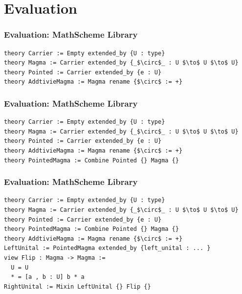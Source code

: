 \documentclass[t,12pt,numbers,fleqn,usenames,xcolor=dvipsnames]{beamer}
\begin{document}
\section{Evaluation}
\begin{frame}[fragile]
\frametitle{Evaluation: MathScheme Library}
\scriptsize	
\begin{lstlisting}
theory Carrier := Empty extended_by {U : type}
theory Magma := Carrier extended_by {_$\circ$_ : U $\to$ U $\to$ U}
theory Pointed := Carrier extended_by {e : U}
theory AddtivieMagma := Magma rename {$\circ$ := +}
\end{lstlisting}
\vfill
{}	
\end{frame}

\begin{frame}[fragile]
\frametitle{Evaluation: MathScheme Library}
\scriptsize	
\begin{lstlisting}
theory Carrier := Empty extended_by {U : type}
theory Magma := Carrier extended_by {_$\circ$_ : U $\to$ U $\to$ U}
theory Pointed := Carrier extended_by {e : U}
theory AddtivieMagma := Magma rename {$\circ$ := +}
theory PointedMagma := Combine Pointed {} Magma {}
\end{lstlisting}
\vfill
{}	
\end{frame}

\begin{frame}[fragile]
\frametitle{Evaluation: MathScheme Library}
\scriptsize	
\begin{lstlisting}
theory Carrier := Empty extended_by {U : type}
theory Magma := Carrier extended_by {_$\circ$_ : U $\to$ U $\to$ U}
theory Pointed := Carrier extended_by {e : U}
theory PointedMagma := Combine Pointed {} Magma {}
theory AddtivieMagma := Magma rename {$\circ$ := +}
LeftUnital := PointedMagma extended_by {left_unital : ... }
view Flip : Magma -> Magma := 
  U = U 
  * = [a , b : U] b * a 
RightUnital := Mixin LeftUnital {} Flip {}     
\end{lstlisting}
\end{frame}
\end{document}
